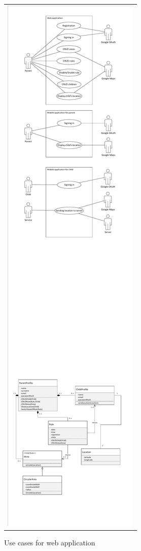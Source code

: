 \documentclass{sprawozdanie-agh}
\begin{document}
		\begin{figure}[H] 
			\centering
			\begin{tabular}{c}
				\includegraphics[width=.80\textwidth]{webUseCase} 
			\end{tabular} 
		\caption{Use cases for web application}
		\end{figure}
\end{document}
